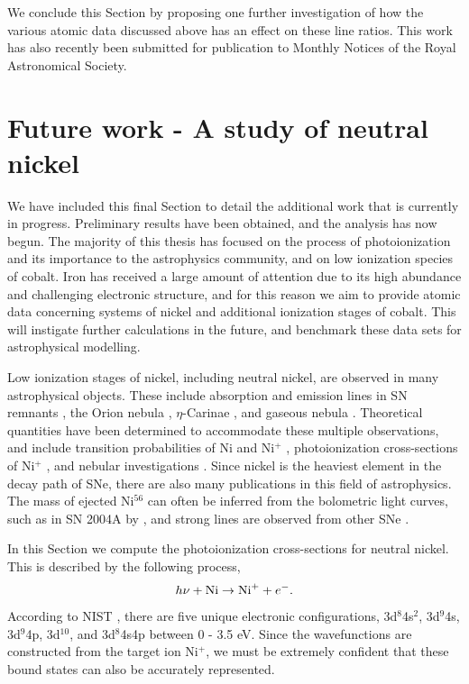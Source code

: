 We conclude this Section by proposing one further investigation of how the various atomic data discussed above has an effect on these line ratios. This work has also recently been submitted for publication to Monthly Notices of the Royal Astronomical Society.

\section{Future work - A study of neutral nickel}
We have included this final Section to detail the additional work that is currently in progress. Preliminary results have been obtained, and the analysis has now begun. The majority of this thesis has focused on the process of photoionization and its importance to the astrophysics community, and on low ionization species of cobalt. Iron has received a large amount of attention due to its high abundance and challenging electronic structure, and for this reason we aim to provide atomic data concerning systems of nickel and additional ionization stages of cobalt. This will instigate further calculations in the future, and benchmark these data sets for astrophysical modelling.

Low ionization stages of nickel, including neutral nickel, are observed in many astrophysical objects. These include absorption and emission lines in SN remnants \citep{1980ApJ...242.1023F}, the Orion nebula \citep{1975ApJ...199L..43G}, $\eta$-Carinae \citep{1967MNRAS.135...51T}, and gaseous nebula \citep{1995A&A...294..555L}. Theoretical quantities have been determined to accommodate these multiple observations, and include transition probabilities of Ni and Ni$^+$ \citep{1996A&AS..119...99Q}, photoionization cross-sections of Ni$^+$ \citep{1999A&AS..137..529B}, and nebular investigations \citep{1982A&A...110..295N}. Since nickel is the heaviest element in the decay path of SNe, there are also many publications in this field of astrophysics. The mass of ejected Ni$^{56}$ can often be inferred from the bolometric light curves, such as in SN 2004A by \citet{2006MNRAS.369.1303H}, and strong lines are observed from other SNe \citep{1990MNRAS.242..669S, 2003MNRAS.346...97N, 2006MNRAS.369.1780V}.

In this Section we compute the photoionization cross-sections for neutral nickel. This is described by the following process,
\begin{equation}\label{eq:conc_photo}
h\nu + {\rm Ni} \rightarrow {\rm Ni}^{+}+e^-.
\end{equation}
According to NIST \cite{1985aeli.book.....S}, there are five unique electronic configurations, 3d$^8$4s$^2$, 3d$^9$4s, 3d$^9$4p, 3d$^{10}$, and 3d$^8$4s4p between 0 - 3.5 eV. Since the wavefunctions are constructed from the target ion Ni$^+$, we must be extremely confident that these bound states can also be accurately represented. 

